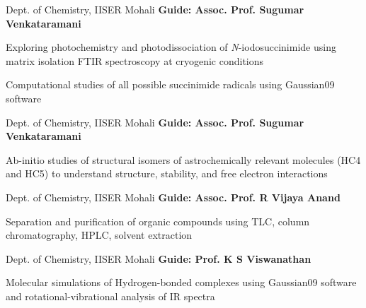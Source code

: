 {%
	 Dept. of Chemistry, IISER Mohali	}
	{%
		\textbf{Guide: Assoc. Prof. Sugumar Venkataramani}~}
	{%
	Exploring photochemistry and photodissociation of \emph{N}-iodosuccinimide using matrix isolation FTIR spectroscopy at cryogenic conditions
	
    Computational studies of all possible succinimide radicals using Gaussian09 software
    }


	{%
	Dept. of Chemistry, IISER Mohali	}
	{%
		\textbf{Guide: Assoc. Prof. Sugumar Venkataramani}~}
	{%
	Ab-initio studies of structural isomers of astrochemically relevant molecules (HC4 and HC5) to understand structure, stability, and free electron interactions

    }

	{%
	Dept. of Chemistry, IISER Mohali	}
	{%
		\textbf{Guide: Assoc. Prof. R Vijaya Anand}~}
	{%
	Separation and purification of organic compounds using TLC, column chromatography, HPLC, solvent extraction
    
    }


	{%
	Dept. of Chemistry, IISER Mohali	}
	{%
		\textbf{Guide: Prof. K S Viswanathan}~}
	{%
	
    Molecular simulations of Hydrogen-bonded complexes using Gaussian09 software and rotational-vibrational analysis of IR spectra
    }
